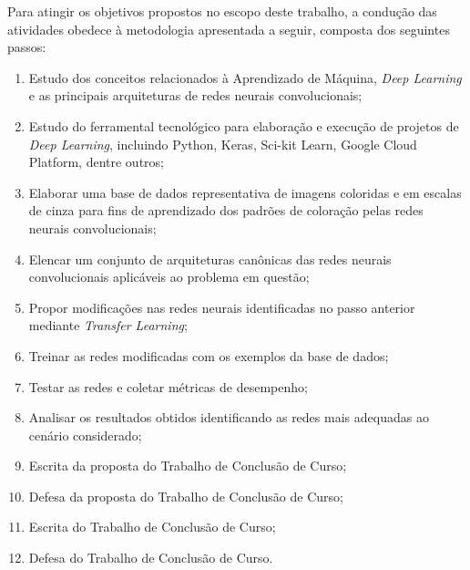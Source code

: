 Para atingir os objetivos propostos no escopo deste trabalho, a condução das atividades obedece à metodologia apresentada a seguir, composta dos seguintes passos:

\begin{enumerate}
	\item Estudo dos conceitos relacionados à Aprendizado de Máquina, \textit{Deep Learning} e as principais arquiteturas de redes neurais convolucionais;
	\item Estudo do ferramental tecnológico para elaboração e execução de projetos de \textit{Deep Learning}, incluindo Python, Keras, Sci-kit Learn, Google Cloud Platform, dentre outros;
	\item Elaborar uma base de dados representativa de imagens coloridas e em escalas de cinza para fins de aprendizado dos padrões de coloração pelas redes neurais convolucionais;
	\item Elencar um conjunto de arquiteturas canônicas das redes neurais convolucionais aplicáveis ao problema em questão;
	\item Propor modificações nas redes neurais identificadas no passo anterior mediante \textit{Transfer Learning};
	\item Treinar as redes modificadas com os exemplos da base de dados;
	\item Testar as redes e coletar métricas de desempenho;
	\item Analisar os resultados obtidos identificando as redes mais adequadas ao cenário considerado;
	\item Escrita da proposta do Trabalho de Conclusão de Curso;
	\item Defesa da proposta do Trabalho de Conclusão de Curso;
	\item Escrita do Trabalho de Conclusão de Curso;
	\item Defesa do Trabalho de Conclusão de Curso.
\end{enumerate}
